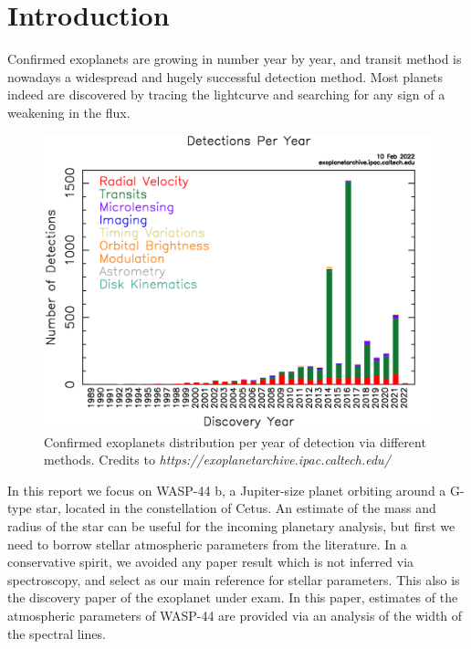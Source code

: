 \documentclass{aa}
\begin{document}

   \maketitle
%

\section{Introduction}

Confirmed exoplanets are growing in number year by year, and transit method 
is nowadays a widespread and hugely successful detection method. Most planets 
indeed are discovered 
by tracing the lightcurve and searching for any sign of a weakening in the 
flux.
\begin{figure}[h]
    \centering  
    \includegraphics[scale=0.2, angle=0]{pictures/detections.png}
    \caption{Confirmed exoplanets distribution per year of detection via different methods. Credits to \textit{https://exoplanetarchive.ipac.caltech.edu/}}
\end{figure}
In this report we focus on WASP-44 b, a Jupiter-size planet orbiting around 
a G-type star, located in the constellation of Cetus. An estimate of the mass and radius
of the star can be useful for the incoming planetary analysis, but first we need to 
borrow stellar atmospheric parameters from the literature. In a conservative spirit, we avoided any paper result which is not inferred via spectroscopy, and select \cite{Anderson} as our main reference for stellar parameters. This also is the discovery paper of the exoplanet under exam. In this paper, estimates of the atmospheric parameters of WASP-44 are provided via an analysis of the width of the spectral lines.
\end{document}
